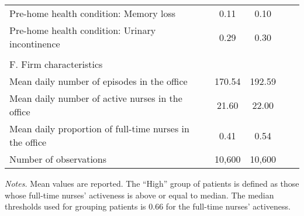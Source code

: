 \documentclass[final,12pt]{article}
\begin{document}
\begin{singlespace}
\begin{table}[H]
\begin{threeparttable}
\begin{tabular}{l*{4}c}
Pre-home health condition: Memory loss  & 0.11  & 0.10 \\
Pre-home health condition: Urinary incontinence  & 0.29  & 0.30 \\
\\
\multicolumn{3}{l}{F. Firm characteristics}\\
Mean daily number of episodes in the office  & 170.54  & 192.59 \\
Mean daily number of active nurses in the office  & 21.60  & 22.00 \\
Mean daily proportion of full-time nurses in the office  & 0.41  & 0.54 \\

\midrule
Number of observations & 10,600 & 10,600\\
\bottomrule
\end{tabular}
	\begin{tablenotes}
	\footnotesize
	\item \emph{Notes.} Mean values are reported. The ``High'' group of patients is defined as those whose full-time nurses' activeness is above or equal to median. The median thresholds used for grouping patients is 0.66 for the full-time nurses' activeness.
	\end{tablenotes}
\end{threeparttable}
\end{table}




\end{singlespace}
\end{document}
